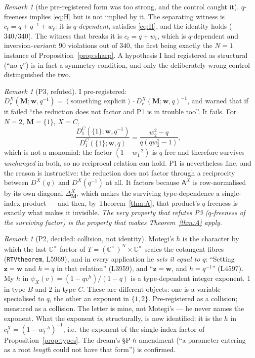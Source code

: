 \documentclass[11pt]{article}
\theoremstyle{plain}
\theoremstyle{definition}
\theoremstyle{remark}
\newtheorem{rem}[thm]{Remark}
\newcommand{\bM}{\mathbf M}
\newcommand{\bw}{\mathbf w}
\begin{document}
\begin{rem}[the pre-registered form was too strong, and the control caught it]
$q$-freeness implies \eqref{eq:H} but is not implied by it. The separating
witness is $c_t=q+q^{-1}+w_t$: it is $q$-\emph{dependent}, satisfies \eqref{eq:H},
and the identity holds ($340/340$). The witness that breaks it is
$c_t=q+w_t$, which is $q$-dependent and inversion-\emph{variant}: $90$ violations
out of $340$, the first being exactly the $N=1$ instance of
Proposition~\ref{prop:sharp}. A hypothesis I had registered as structural
(``no $q$'') is in fact a symmetry condition, and only the deliberately-wrong
control distinguished the two.
\end{rem}

\begin{rem}[P3, refuted]
I pre-registered: $D^X_r(\bM;\bw,q^{-1})=(\text{something explicit})\cdot
D^X_r(\bM;\bw,q)^{-1}$, and warned that if it failed ``the reduction does not
factor and P1 is in trouble too''. It fails. For $N=2$, $\bM=\{1\}$, $X=C$,
\[
\frac{D^C_1(\{1\};\bw,q^{-1})}{D^C_1(\{1\};\bw,q)}
=\frac{w_2^2-q}{q(qw_2^2-1)},
\]
which is not a monomial: the factor $(1-w_1^{-2})$ is $q$-free and therefore
survives \emph{unchanged} in both, so no reciprocal relation can hold.
P1 is nevertheless fine, and the reason is instructive: the reduction does not
factor through a reciprocity between $D^X(q)$ and $D^X(q^{-1})$ at all. It
factors because $\mathsf A^X$ is row-normalised by its own diagonal
$\Delta^X_\bM$, which makes the surviving type-dependence a single-index product
--- and then, by Theorem~\ref{thm:A}, that product's $q$-freeness is exactly what
makes it invisible. \emph{The very property that refutes P3 ($q$-freeness of the
surviving factor) is the property that makes Theorem~\ref{thm:A} apply.}
\end{rem}

\begin{rem}[P2, decided: collision, not identity]
Motegi's $h$ is the character by which the last $\mathbb C^\times$ factor of
$T=(\mathbb C^\times)^N\times\mathbb C^\times$ scales the cotangent fibres
(\texttt{RTVtheorem}, L5969), and in every application he \emph{sets it equal to
$q$}: ``Setting $\mathbf z=\bw$ and $h=q$ in that relation'' (L3959), and
``$\mathbf z=\bw$, and $h=q^{-1}$'' (L4597). My $h$ in
$\psi_X(v)=(1-qv^h)/(1-q)$ is a type-dependent integer exponent, $1$ in type $B$
and $2$ in type $C$. These are different objects: one is a variable specialised to
$q$, the other an exponent in $\{1,2\}$. Pre-registered as a collision; measured
as a collision. The letter is mine, not Motegi's --- he never names the exponent.
What the exponent \emph{is}, structurally, is now identified: it is the $h$ in
$c^X_t=(1-w_t^{-h})^{-1}$, i.e.\ the exponent of the single-index factor of
Proposition~\ref{prop:types}. The dream's \S P-$h$ amendment (``a parameter
entering as a root \emph{length} could not have that form'') is confirmed.
\end{rem}
\end{document}
